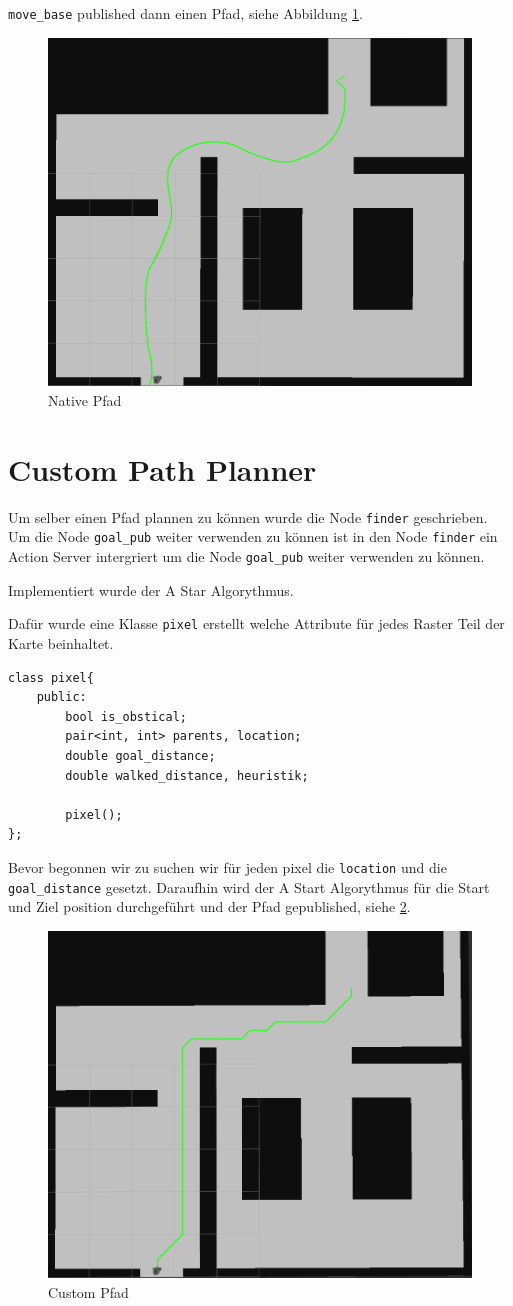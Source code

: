 \documentclass{article}
\begin{document}
\verb|move_base| published dann einen Pfad, siehe Abbildung \ref{path_nativ}.

\begin{figure}[!htbp]
    \centering
    \includegraphics[width=0.5\linewidth]{PICs/nativ_rviz_plan.png}
    \caption{Native Pfad}\label{path_nativ}
\end{figure}

\section{Custom Path Planner}

Um selber einen Pfad plannen zu können wurde die Node \verb|finder| geschrieben.
Um die Node \verb|goal_pub| weiter verwenden zu können ist in den Node \verb|finder| ein Action Server intergriert um die Node \verb|goal_pub| weiter verwenden zu können.

Implementiert wurde der A Star Algorythmus.\newline

Dafür wurde eine Klasse \texttt{pixel} erstellt welche Attribute für jedes Raster Teil der Karte beinhaltet.

\begin{lstlisting}
class pixel{
    public:
        bool is_obstical;
        pair<int, int> parents, location;
        double goal_distance;
        double walked_distance, heuristik;

        pixel();
};
\end{lstlisting}

Bevor begonnen wir zu suchen wir für jeden pixel die \verb|location| und die \verb|goal_distance| gesetzt. 
Daraufhin wird der A Start Algorythmus für die Start und Ziel position durchgeführt und der Pfad gepublished, siehe \ref{path_custom}.

\begin{figure}[!htbp]
    \centering
    \includegraphics[width=0.5\linewidth]{PICs/custom_rviz_plan.png}
    \caption{Custom Pfad}\label{path_custom}
\end{figure}
\end{document}
